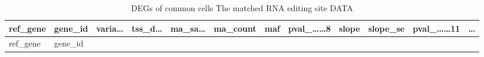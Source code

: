 \documentclass[
]{article}
\begin{document}
\begin{longtable}[]{@{}llllllllllll@{}}
\caption{\label{tab:DEGs-of-common-cells-The-matched-RNA-editing-site-DATA}DEGs of common cells The matched RNA editing site DATA}\tabularnewline
\toprule
\begin{minipage}[b]{0.06\columnwidth}\raggedright
ref\_gene\strut
\end{minipage} & \begin{minipage}[b]{0.06\columnwidth}\raggedright
gene\_id\strut
\end{minipage} & \begin{minipage}[b]{0.06\columnwidth}\raggedright
varia\ldots{}\strut
\end{minipage} & \begin{minipage}[b]{0.06\columnwidth}\raggedright
tss\_d\ldots{}\strut
\end{minipage} & \begin{minipage}[b]{0.06\columnwidth}\raggedright
ma\_sa\ldots{}\strut
\end{minipage} & \begin{minipage}[b]{0.06\columnwidth}\raggedright
ma\_count\strut
\end{minipage} & \begin{minipage}[b]{0.06\columnwidth}\raggedright
maf\strut
\end{minipage} & \begin{minipage}[b]{0.08\columnwidth}\raggedright
pval\_\ldots\ldots8\strut
\end{minipage} & \begin{minipage}[b]{0.06\columnwidth}\raggedright
slope\strut
\end{minipage} & \begin{minipage}[b]{0.06\columnwidth}\raggedright
slope\_se\strut
\end{minipage} & \begin{minipage}[b]{0.09\columnwidth}\raggedright
pval\_\ldots\ldots11\strut
\end{minipage} & \begin{minipage}[b]{0.02\columnwidth}\raggedright
\ldots{}\strut
\end{minipage}\tabularnewline
\midrule
\endfirsthead
\toprule
\begin{minipage}[b]{0.06\columnwidth}\raggedright
ref\_gene\strut
\end{minipage} & \begin{minipage}[b]{0.06\columnwidth}\raggedright
gene\_id\strut
\end{minipage} & \begin{minipage}[b]{0.06\columnwidth}\raggedright

\end{minipage}
\end{longtable}
\end{document}
